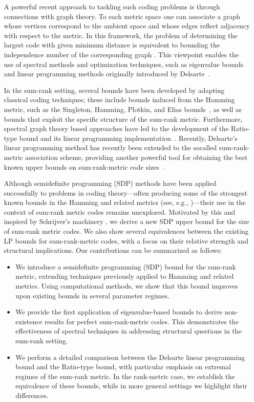 \documentclass[a4paper]{article}
\begin{document}
A powerful recent approach to tackling such coding problems is through connections with graph theory. To each metric space one can associate a graph whose vertices correspond to the ambient space and whose edges reflect adjacency with respect to the metric. In this framework, the problem of determining the largest code with given minimum distance is equivalent to bounding the independence number of the corresponding graph \cite{APR2025}. This viewpoint enables the use of spectral methods and optimization techniques, such as eigenvalue bounds and linear programming methods originally introduced by Delsarte~\cite{DelsarteLP}.  


In the sum-rank setting, several bounds have been developed by adapting classical coding techniques; these include bounds induced from the Hamming metric, such as the Singleton, Hamming, Plotkin, and Elias bounds~\cite{byrne2021fundamental}, as well as bounds that exploit the specific structure of the sum-rank metric. Furthermore, spectral graph theory based approaches have led to the development of the Ratio-type bound and its linear programming implementation~\cite{AKR2024}. Recently, Delsarte’s linear programming method has recently been extended to the socalled sum-rank-metric association scheme, providing another powerful tool for obtaining the best known upper bounds on sum-rank-metric code sizes~\cite{AGKP2024}.

Although semidefinite programming (SDP) methods have been applied successfully to problems in coding theory—often producing some of the strongest known bounds in the Hamming and related metrics (see, e.g., \cite{S2005,bachoc2010applications})—their use in the context of sum-rank metric codes remains unexplored. Motivated by this and inspired by Schrijver's machinery \cite{S2005}, we  derive a new SDP upper bound for the size of sum-rank metric codes. We also show several equivalences between the existing LP bounds for sum-rank-metric codes, with a focus on their relative strength and structural implications. Our contributions can be summarized as follows:
\begin{itemize}
    \item We introduce a semidefinite programming (SDP) bound for the sum-rank metric, extending techniques previously applied to Hamming and related metrics. Using computational methods, we show that this bound improves upon existing bounds in several parameter regimes.
    \item We provide the first application of eigenvalue-based bounds to derive non-existence results for perfect sum-rank-metric codes. This demonstrates the effectiveness of spectral techniques in addressing structural questions in the sum-rank setting.
    \item We perform a detailed comparison between the Delsarte linear programming bound and the Ratio-type bound, with particular emphasis on extremal regimes of the sum-rank metric. In the rank-metric case, we establish the equivalence of these bounds, while in more general settings we highlight their differences.
\end{itemize}
\end{document}
